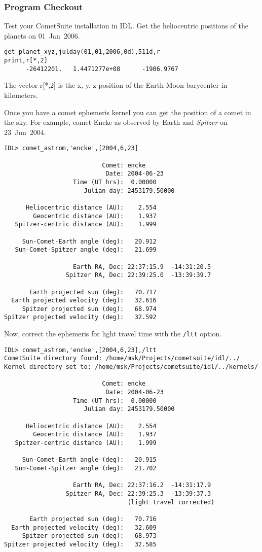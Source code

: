 \documentclass[12pt,letterpaper]{article}
\newcommand\cs{CometSuite}
\begin{document}
\subsubsection{Program Checkout}
Test your \cs{} installation in IDL.  Get the heliocentric
positions of the planets on 01~Jan~2006.
\begin{lstlisting}
get_planet_xyz,julday(01,01,2006,0d),511d,r
print,r[*,2]
      -26412201.   1.4471277e+08      -1906.9767
\end{lstlisting}
The vector r[*,2] is the x, y, z position of the Earth-Moon barycenter
in kilometers.

Once you have a comet ephemeris kernel you can get the position of a
comet in the sky.  For example, comet Encke as observed by Earth and
\textit{Spitzer} on 23~Jun~2004.
\begin{lstlisting}
IDL> comet_astrom,'encke',[2004,6,23]

                           Comet: encke
                            Date: 2004-06-23
                   Time (UT hrs):  0.00000
                      Julian day: 2453179.50000

      Heliocentric distance (AU):    2.554
        Geocentric distance (AU):    1.937
   Spitzer-centric distance (AU):    1.999

     Sun-Comet-Earth angle (deg):   20.912
   Sun-Comet-Spitzer angle (deg):   21.699

                   Earth RA, Dec: 22:37:15.9  -14:31:20.5
                 Spitzer RA, Dec: 22:39:25.0  -13:39:39.7

       Earth projected sun (deg):   70.717
  Earth projected velocity (deg):   32.616
     Spitzer projected sun (deg):   68.974
Spitzer projected velocity (deg):   32.592
\end{lstlisting}
Now, correct the ephemeris for light travel time with the
\texttt{/ltt} option.
\begin{lstlisting}
IDL> comet_astrom,'encke',[2004,6,23],/ltt
CometSuite directory found: /home/msk/Projects/cometsuite/idl/../
Kernel directory set to: /home/msk/Projects/cometsuite/idl/../kernels/

                           Comet: encke
                            Date: 2004-06-23
                   Time (UT hrs):  0.00000
                      Julian day: 2453179.50000

      Heliocentric distance (AU):    2.554
        Geocentric distance (AU):    1.937
   Spitzer-centric distance (AU):    1.999

     Sun-Comet-Earth angle (deg):   20.915
   Sun-Comet-Spitzer angle (deg):   21.702

                   Earth RA, Dec: 22:37:16.2  -14:31:17.9
                 Spitzer RA, Dec: 22:39:25.3  -13:39:37.3
                                  (light travel corrected)

       Earth projected sun (deg):   70.716
  Earth projected velocity (deg):   32.609
     Spitzer projected sun (deg):   68.973
Spitzer projected velocity (deg):   32.585
\end{lstlisting}
\end{document}
